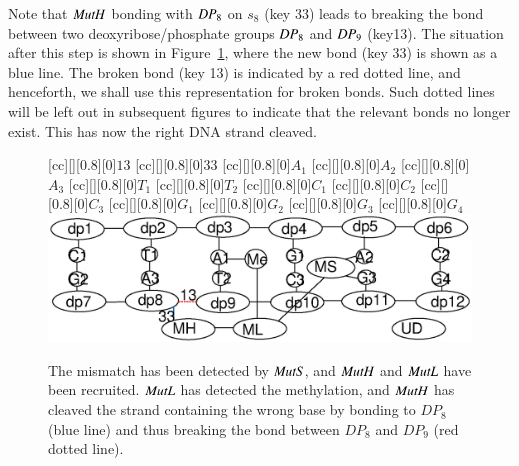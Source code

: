 Note that $\mathit{MutH}$ bonding with $\mathit{DP}_8$ on $s_8$ (key 33) leads to breaking the bond between two deoxyribose/phosphate groups $\mathit{DP}_8$ and $\mathit{DP}_9$ (key13). 
%
%
The situation after this step is shown in Figure~\ref{fig:state2}, where the new bond (key 33) is shown as a blue line. The broken bond (key 13) is indicated by a red dotted line, and henceforth, we shall use this representation for broken bonds. Such dotted lines will be left out in subsequent figures to indicate that the relevant bonds no longer exist.  This has now the right DNA strand cleaved.

\begin{figure}[h!]
[cc][][0.8][0]{$13$}
[cc][][0.8][0]{$33$}
[cc][][0.8][0]{$A_1$}
[cc][][0.8][0]{$A_2$}
[cc][][0.8][0]{$A_3$}
[cc][][0.8][0]{$T_1$}
[cc][][0.8][0]{$T_2$}
[cc][][0.8][0]{$C_1$}
[cc][][0.8][0]{$C_2$}
[cc][][0.8][0]{$C_3$}
[cc][][0.8][0]{$G_1$}
[cc][][0.8][0]{$G_2$}
[cc][][0.8][0]{$G_3$}
[cc][][0.8][0]{$G_4$}
  \centering
    \includegraphics[width=1.0\textwidth]{mmr/state2}
  \caption[A six base pair DNA fragment.]{%
  The mismatch has been detected by $\mathit{MutS}$, and $\mathit{MutH}$ and $\mathit{MutL}$ have been recruited. $\mathit{MutL}$ has detected the methylation, and $\mathit{MutH}$ has cleaved the strand containing the wrong base by bonding to $DP_8$ (blue line) and thus breaking   the bond between $DP_8$ and $DP_9$ (red dotted line).}
  \label{fig:state2}
\end{figure}

